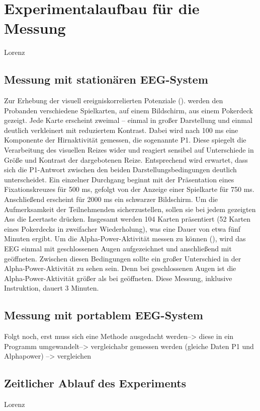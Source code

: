 \section{Experimentalaufbau für die Messung} 
Lorenz \newline

\subsection{Messung mit stationären EEG-System}
Zur Erhebung der visuell ereigniskorrelierten Potenziale (). werden den Probanden verschiedene Spielkarten, auf einem Bildschirm,  aus einem Pokerdeck gezeigt. Jede Karte erscheint zweimal – einmal in großer Darstellung und einmal deutlich verkleinert mit reduziertem Kontrast. Dabei wird nach 100 ms eine Komponente der Hirnaktivität gemessen, die sogenannte P1. Diese spiegelt die Verarbeitung des visuellen Reizes wider und reagiert sensibel auf Unterschiede in Größe und Kontrast der dargebotenen Reize. Entsprechend wird erwartet, dass sich die P1-Antwort zwischen den beiden Darstellungsbedingungen deutlich unterscheidet.
Ein einzelner Durchgang beginnt mit der Präsentation eines Fixationskreuzes für 500 ms, gefolgt von der Anzeige einer Spielkarte für 750 ms. Anschließend erscheint für 2000 ms ein schwarzer Bildschirm. Um die Aufmerksamkeit der Teilnehmenden sicherzustellen, sollen sie bei jedem gezeigten  Ass die Leertaste drücken. Insgesamt werden 104 Karten präsentiert (52 Karten eines Pokerdecks in zweifacher Wiederholung), was eine Dauer von etwa fünf Minuten ergibt.
Um die Alpha-Power-Aktivität messen zu können (), wird das EEG einmal mit geschlossenen Augen aufgezeichnet und anschließend mit geöffneten. Zwischen diesen Bedingungen sollte ein großer Unterschied in der Alpha-Power-Aktivität zu sehen sein. Denn bei geschlossenen Augen ist die Alpha-Power-Aktivität größer als bei geöffneten. Diese Messung, inklusive Instruktion, dauert 3 Minuten.




    \subsection{Messung mit portablem EEG-System}
Folgt noch, erst muss sich eine Methode ausgedacht werden--> diese in ein Programm umgewandelt--> vergleichabr gemessen werden (gleiche Daten P1 und Alphapower) --> vergleichen

    \subsection{Zeitlicher Ablauf des Experiments} 
    Lorenz \newline

